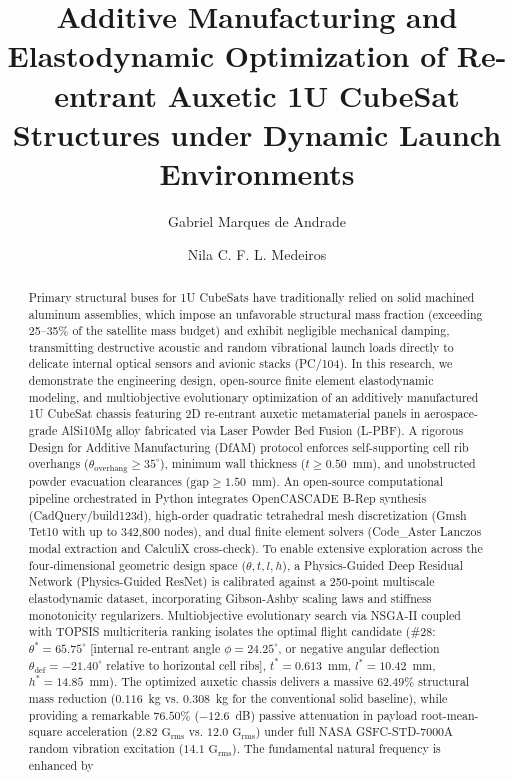 \documentclass[preprint,12pt,3p]{elsarticle}
\begin{document}
\begin{frontmatter}

\title{Additive Manufacturing and Elastodynamic Optimization of Re-entrant Auxetic 1U CubeSat Structures under Dynamic Launch Environments}

\author[uesc]{Gabriel Marques de Andrade}

\author[uesc]{Nila C. F. L. Medeiros}

\address[uesc]{Department of Exact and Technological Sciences, State University of Santa Cruz (UESC), Rodovia Jorge Amado km 16, Ilh\'eus, BA 45662-900, Brazil}

\begin{abstract}
Primary structural buses for 1U CubeSats have traditionally relied on solid machined aluminum assemblies, which impose an unfavorable structural mass fraction (exceeding 25--35\% of the satellite mass budget) and exhibit negligible mechanical damping, transmitting destructive acoustic and random vibrational launch loads directly to delicate internal optical sensors and avionic stacks (PC/104). In this research, we demonstrate the engineering design, open-source finite element elastodynamic modeling, and multiobjective evolutionary optimization of an additively manufactured 1U CubeSat chassis featuring 2D re-entrant auxetic metamaterial panels in aerospace-grade AlSi10Mg alloy fabricated via Laser Powder Bed Fusion (L-PBF). A rigorous Design for Additive Manufacturing (DfAM) protocol enforces self-supporting cell rib overhangs ($\theta_{\text{overhang}} \ge 35^\circ$), minimum wall thickness ($t \ge 0.50$~mm), and unobstructed powder evacuation clearances ($\text{gap} \ge 1.50$~mm). An open-source computational pipeline orchestrated in Python integrates OpenCASCADE B-Rep synthesis (CadQuery/build123d), high-order quadratic tetrahedral mesh discretization (Gmsh Tet10 with up to 342,800 nodes), and dual finite element solvers (Code\_Aster Lanczos modal extraction and CalculiX cross-check). To enable extensive exploration across the four-dimensional geometric design space ($\theta, t, l, h$), a Physics-Guided Deep Residual Network (Physics-Guided ResNet) is calibrated against a 250-point multiscale elastodynamic dataset, incorporating Gibson-Ashby scaling laws and stiffness monotonicity regularizers. Multiobjective evolutionary search via NSGA-II coupled with TOPSIS multicriteria ranking isolates the optimal flight candidate (\#28: $\theta^* = 65.75^\circ$ [internal re-entrant angle $\phi = 24.25^\circ$, or negative angular deflection $\theta_{\text{def}} = -21.40^\circ$ relative to horizontal cell ribs], $t^* = 0.613$~mm, $l^* = 10.42$~mm, $h^* = 14.85$~mm). The optimized auxetic chassis delivers a massive $62.49\%$ structural mass reduction ($0.116$~kg vs. $0.308$~kg for the conventional solid baseline), while providing a remarkable $76.50\%$ ($-12.6$~dB) passive attenuation in payload root-mean-square acceleration ($2.82\text{ G}_{\text{rms}}$ vs. $12.0\text{ G}_{\text{rms}}$) under full NASA GSFC-STD-7000A random vibration excitation ($14.1\text{ G}_{\text{rms}}$). The fundamental natural frequency is enhanced by 
\end{abstract}
\end{frontmatter}
\end{document}

